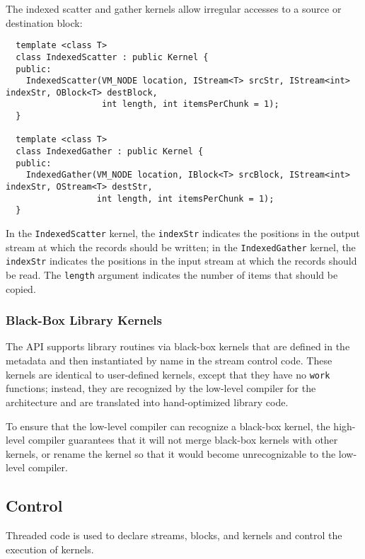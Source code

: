 The indexed scatter and gather kernels allow irregular accesses to a
source or destination block:
{\small
\begin{verbatim}
  template <class T>
  class IndexedScatter : public Kernel {
  public:
    IndexedScatter(VM_NODE location, IStream<T> srcStr, IStream<int> indexStr, OBlock<T> destBlock, 
                   int length, int itemsPerChunk = 1);
  }

  template <class T>
  class IndexedGather : public Kernel {
  public:
    IndexedGather(VM_NODE location, IBlock<T> srcBlock, IStream<int> indexStr, OStream<T> destStr, 
                  int length, int itemsPerChunk = 1);
  }  
\end{verbatim}}
In the {\tt IndexedScatter} kernel, the {\tt indexStr} indicates the
positions in the output stream at which the records should be written;
in the {\tt IndexedGather} kernel, the {\tt indexStr} indicates the
positions in the input stream at which the records should be read.
The {\tt length} argument indicates the number of items that should be
copied.

\subsubsection{Black-Box Library Kernels}
\label{sec:kernelllc}

The API supports library routines via black-box kernels that are
defined in the metadata and then instantiated by name in the stream
control code.  These kernels are identical to user-defined kernels,
except that they have no {\tt work} functions; instead, they are 
recognized by the low-level compiler for the architecture and are 
translated into hand-optimized library code.

To ensure that the low-level compiler can recognize a black-box
kernel, the high-level compiler guarantees that it will not merge
black-box kernels with other kernels, or rename the kernel so that it
would become unrecognizable to the low-level compiler.

\subsection{Control}
\label{sec:control}

Threaded code is used to declare streams, blocks, and kernels and control
the execution of kernels.

